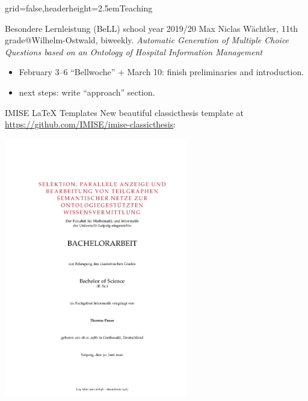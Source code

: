 \documentclass[]{kiesgrube}
\begin{document}
\begin{poster}%
{grid=false,headerheight=2.5em}{}{Teaching}{}

\begin{posterbox}[name=person,column=0,row=0]{Besondere Lernleistung (BeLL) school year 2019/20}
Max Niclas Wächtler, 11th grade@Wilhelm-Ostwald, biweekly.
\emph{Automatic Generation of Multiple Choice Questions based on an Ontology of Hospital Information Management}
\begin{itemize}
\item February 3--6 \enquote{Bellwoche} + March 10: finish preliminaries and introduction.
\item next steps: write \enquote{approach} section.
\end{itemize}
\end{posterbox}
\begin{posterbox}[name=risks,column=1,row=0]{IMISE LaTeX Templates}
New beautiful classicthesis template at \url{https://github.com/IMISE/imise-classicthesis}:
\begin{center}
\includegraphics[width=0.6\textwidth,trim=5.5cm 8cm 2.5cm 6cm,clip]{img/tp_ba_s1.pdf}
\end{center}

\end{posterbox}
\end{poster}
\end{document}
